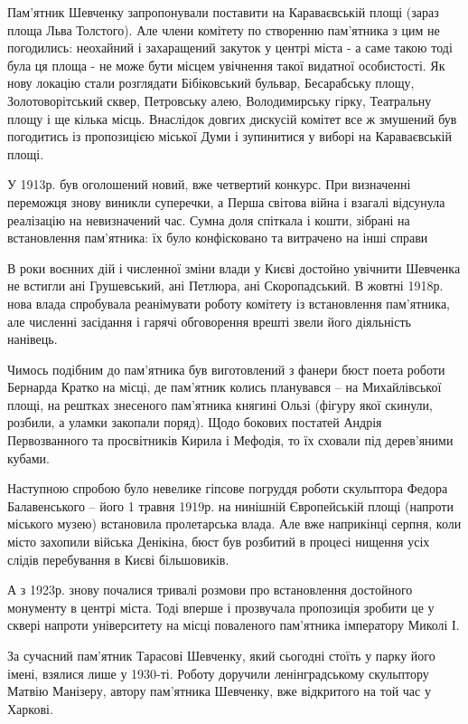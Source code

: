 Пам’ятник Шевченку запропонували поставити на Караваєвській площі (зараз площа
Льва Толстого). Але члени комітету по створенню пам’ятника з цим не погодились:
неохайний і захаращений закуток у центрі міста - а саме такою тоді була ця
площа - не може бути місцем увічнення такої видатної особистості. Як нову
локацію стали розглядати Бібіковський бульвар, Бесарабську площу,
Золотоворітський сквер, Петровську алею, Володимирську гірку, Театральну площу
і ще кілька місць. Внаслідок довгих дискусій комітет все ж змушений був
погодитись із пропозицією міської Думи і зупинитися у виборі на Караваєвській
площі.

У 1913р. був оголошений новий, вже четвертий конкурс. При визначенні переможця
знову виникли суперечки, а Перша світова війна і взагалі відсунула реалізацію
на невизначений час. Сумна доля спіткала і кошти, зібрані на встановлення
пам'ятника: їх було конфісковано та витрачено на інші справи

В роки воєнних дій і численної зміни влади у Києві достойно увічнити Шевченка
не встигли ані Грушевський, ані Петлюра, ані Скоропадський. В жовтні 1918р.
нова влада спробувала реанімувати роботу комітету із встановлення пам’ятника,
але численні засідання і гарячі обговорення врешті звели його діяльність
нанівець.

Чимось подібним до пам’ятника був виготовлений з фанери бюст поета роботи
Бернарда Кратко на місці, де пам’ятник колись планувався – на Михайлівської
площі, на рештках знесеного пам’ятника княгині Ользі (фігуру якої скинули,
розбили, а уламки закопали поряд). Щодо бокових постатей Андрія Первозванного
та просвітників Кирила і Мефодія, то їх сховали під дерев’яними кубами.

Наступною спробою було невелике гіпсове погруддя роботи скульптора Федора
Балавенського – його 1 травня 1919р. на нинішній Європейській площі (напроти
міського музею) встановила пролетарська влада. Але вже наприкінці серпня, коли
місто захопили війська Денікіна, бюст був розбитий в процесі нищення усіх
слідів перебування в Києві більшовиків.

А з 1923р. знову почалися тривалі розмови про встановлення достойного монументу
в центрі міста. Тоді вперше і прозвучала пропозиція зробити це у сквері напроти
університету на місці поваленого пам’ятника імператору Миколі І.

За сучасний пам’ятник Тарасові Шевченку, який сьогодні стоїть у парку його
імені, взялися лише у 1930-ті. Роботу доручили ленінградському скульптору
Матвію Манізеру, автору пам’ятника Шевченку, вже відкритого на той час у
Харкові.

